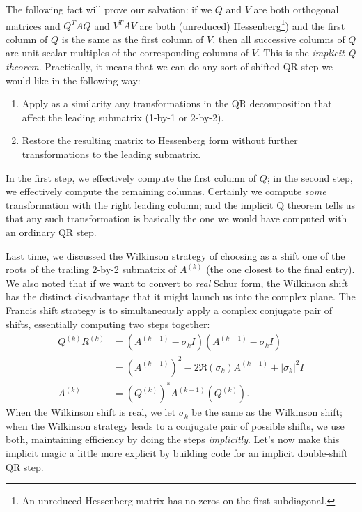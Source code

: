 The following fact will prove our salvation: if we $Q$ and $V$ are
both orthogonal matrices and $Q^T A Q$ and $V^T A V$ are both
(unreduced) Hessenberg\footnote{ An unreduced Hessenberg matrix has no
  zeros on the first subdiagonal.  })  and the first column of $Q$ is
the same as the first column of $V$, then all successive columns of
$Q$ are unit scalar multiples of the corresponding columns of $V$.
This is the {\em implicit Q theorem}.  Practically, it means that we
can do any sort of shifted QR step we would like in the following way:
\begin{enumerate}
\item
  Apply as a similarity any transformations in the QR decomposition
  that affect the leading submatrix (1-by-1 or 2-by-2).
\item
  Restore the resulting matrix to Hessenberg form without further
  transformations to the leading submatrix.
\end{enumerate}
In the first step, we effectively compute the first column of $Q$;
in the second step, we effectively compute the remaining columns.
Certainly we compute {\em some} transformation with the right leading
column; and the implicit Q theorem tells us that any such transformation
is basically the one we would have computed with an ordinary QR step.

Last time, we discussed the Wilkinson strategy of choosing as a shift
one of the roots of the trailing 2-by-2 submatrix of $A^{(k)}$ (the
one closest to the final entry).  We also noted that if we want to
convert to {\em real} Schur form, the Wilkinson shift has the distinct
disadvantage that it might launch us into the complex plane.  The
Francis shift strategy is to simultaneously apply a complex conjugate
pair of shifts, essentially computing two steps together:
\begin{align*}
  Q^{(k)} R^{(k)} &= (A^{(k-1)}-\sigma_k I)(A^{(k-1)}-\bar{\sigma}_k I) \\
                &= (A^{(k-1)})^2 - 2\Re(\sigma_k) A^{(k-1)} + |\sigma_k|^2 I \\
  A^{(k)}        &= (Q^{(k)})^* A^{(k-1)} (Q^{(k)}).
\end{align*}
When the Wilkinson shift is real, we let $\sigma_k$ be the same as the
Wilkinson shift; when the Wilkinson strategy leads to a conjugate pair
of possible shifts, we use both, maintaining efficiency by doing the
steps {\em implicitly}.  Let's now make this implicit magic a little
more explicit by building code for an implicit double-shift QR step.

